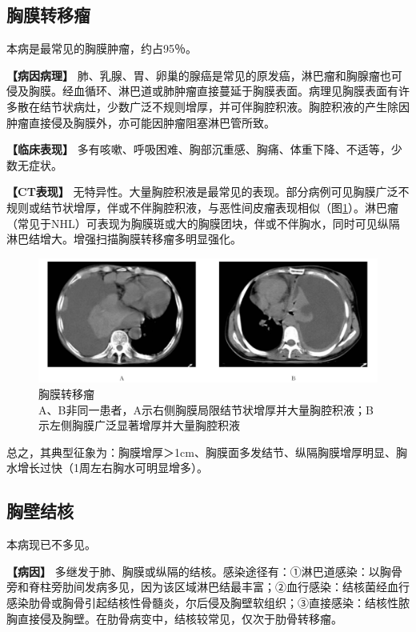 \subsection{胸膜转移瘤}

本病是最常见的胸膜肿瘤，约占95％。

\textbf{【病因病理】}
肺、乳腺、胃、卵巢的腺癌是常见的原发癌，淋巴瘤和胸腺瘤也可侵及胸膜。经血循环、淋巴道或肺肿瘤直接蔓延于胸膜表面。病理见胸膜表面有许多散在结节状病灶，少数广泛不规则增厚，并可伴胸腔积液。胸腔积液的产生除因肿瘤直接侵及胸膜外，亦可能因肿瘤阻塞淋巴管所致。

\textbf{【临床表现】}
多有咳嗽、呼吸困难、胸部沉重感、胸痛、体重下降、不适等，少数无症状。

\textbf{【CT表现】}
无特异性。大量胸腔积液是最常见的表现。部分病例可见胸膜广泛不规则或结节状增厚，伴或不伴胸腔积液，与恶性间皮瘤表现相似（图\ref{fig9-47}）。淋巴瘤（常见于NHL）可表现为胸膜斑或大的胸膜团块，伴或不伴胸水，同时可见纵隔淋巴结增大。增强扫描胸膜转移瘤多明显强化。

\begin{figure}[!htbp]
 \centering
 \includegraphics[width=.7\textwidth,height=\textheight,keepaspectratio]{./images/Image00245.jpg}
 \captionsetup{justification=centering}
 \caption{胸膜转移瘤\\{\small A、B非同一患者，A示右侧胸膜局限结节状增厚并大量胸腔积液；B示左侧胸膜广泛显著增厚并大量胸腔积液}}
 \label{fig9-47}
  \end{figure} 

总之，其典型征象为：胸膜增厚＞1cm、胸膜面多发结节、纵隔胸膜增厚明显、胸水增长过快（1周左右胸水可明显增多）。

\subsection{胸壁结核}

本病现已不多见。

\textbf{【病因】}
多继发于肺、胸膜或纵隔的结核。感染途径有：①淋巴道感染：以胸骨旁和脊柱旁肋间发病多见，因为该区域淋巴结最丰富；②血行感染：结核菌经血行感染肋骨或胸骨引起结核性骨髓炎，尔后侵及胸壁软组织；③直接感染：结核性脓胸直接侵及胸壁。在肋骨病变中，结核较常见，仅次于肋骨转移瘤。

